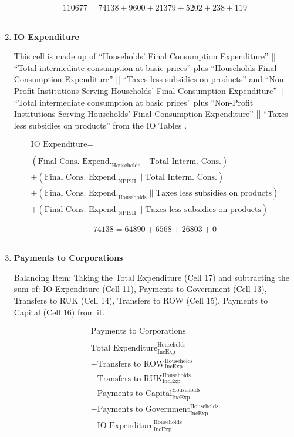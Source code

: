\begin{enumerate}
\begin{equation} \nonumber
110677 = 74138+9600+21379+5202+238+119
\end{equation}\\


\item \textbf {IO Expenditure}

This cell is made up of ``Households' Final Consumption Expenditure'' || ``Total intermediate consumption at basic prices'' plus ``Households Final Consumption Expenditure'' || ``Taxes less subsidies on products'' and ``Non-Profit Institutions Serving Households' Final Consumption Expenditure'' || ``Total intermediate consumption at basic prices'' plus ``Non-Profit Institutions Serving Households' Final Consumption Expenditure'' || ``Taxes less subsidies on products'' from the IO Tables \cite{ScotGov2013a}.

\begin{equation}
\begin{split}
\text{IO Expenditure} =  \\ \\
(\text{Final Cons. Expend.}_\text{Households}\|\text{Total Interm. Cons.})\\
+(\text{Final Cons. Expend.}_\text{NPISH}\|\text{Total Interm. Cons.})\\
+(\text{Final Cons. Expend.}_\text{Households}\|\text{Taxes less subsidies on products})\\
+(\text{Final Cons. Expend.}_\text{NPISH}\|\text{Taxes less subsidies on products})
\end{split} \label{eq:2.5.15}
\end{equation}

\begin{equation} \nonumber
74138 = 64890+6568+26803+0
\end{equation}\\


\item \textbf {Payments to Corporations}

Balancing Item: Taking the Total Expenditure (Cell 17) and subtracting the sum of: IO Expenditure (Cell 11), Payments to Government (Cell 13), Transfers to RUK (Cell 14), Transfers to ROW (Cell 15), Payments to Capital (Cell 16) from it.

\begin{equation}
\begin{split}
\text{Payments to Corporations} =  \\ \\
\text{Total Expenditure}^\text{Households}_\text{IncExp}\\
-\text{Transfers to ROW}^\text{Households}_\text{IncExp}\\
-\text{Transfers to RUK}^\text{Households}_\text{IncExp}\\
-\text{Payments to Capital}^\text{Households}_\text{IncExp}\\
-\text{Payments to Government}^\text{Households}_\text{IncExp}\\
-\text{IO Expenditure}^\text{Households}_\text{IncExp}
\end{split} \label{eq:2.5.16}
\end{equation}


\end{enumerate}

